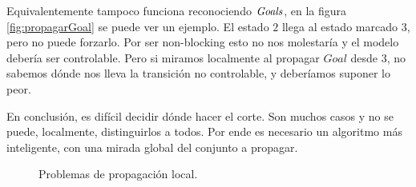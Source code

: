 Equivalentemente tampoco funciona reconociendo $\mathit{Goals}$, en la figura \ref{fig:propagarGoal} se puede ver un ejemplo. El estado $2$ llega al estado marcado $3$, pero no puede forzarlo. Por ser non-blocking esto no nos molestaría y el modelo debería ser controlable. Pero si miramos localmente al propagar $Goal$ desde $3$, no sabemos dónde nos lleva la transición no controlable, y deberíamos suponer lo peor.

En conclusión, es difícil decidir dónde hacer el corte. Son muchos casos y no se puede, localmente, distinguirlos a todos. Por ende es necesario un algoritmo más inteligente, con una mirada global del conjunto a propagar.
\begin{figure}[htb]
	\centering
	\caption{Problemas de propagación local.}
	\label{fig:propagacionLocal}
\end{figure}

